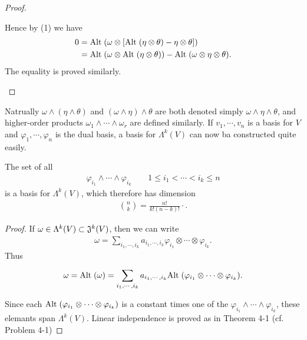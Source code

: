 \begin{proof}
\begin{enumerate}[label=(\arabic*)]
            Hence by (1) we have 
            \begin{align*}
                0 
                & = \mathrm{Alt}\;(\omega\otimes [\mathrm{Alt}\;(\eta\otimes\theta) - \eta\otimes\theta]) \\
                & = \mathrm{Alt}\;(\omega\otimes\mathrm{Alt}\;(\eta\otimes\theta)) - \mathrm{Alt}\;(\omega\otimes\eta\otimes\theta). 
            \end{align*}
            The equality is proved similarly.
    \end{enumerate}
\end{proof}

Natrually $\omega\wedge(\eta\wedge\theta)$ and $(\omega\wedge\eta)\wedge\theta$ are both denoted simply 
$\omega\wedge\eta\wedge\theta$, and higher-order products $\omega_1\wedge\cdots\wedge\omega_r$ are defined 
similarly. If $v_1, \cdots, v_n$ is a basis for $V$ and $\varphi_1,\cdots, \varphi_n$ is the dual basis,
a basis for $\Lambda^k(V)$ can now ba constructed quite easily. 

\begin{theorem}
    The set of all
    \begin{align*}
      \varphi_{i_1}\wedge\cdots\wedge\varphi_{i_k}\quad\quad 1\leq i_1<\cdots<i_k\le n
    \end{align*} 
    is a basis for $\Lambda^k(V)$, which therefore has dimension 
    \begin{align*}
      \binom nk=\frac{n!}{k!(n-k)!}\cdotp.
    \end{align*}
\end{theorem}

\begin{proof}
    If $\omega\in \Lambda^k(V)\subset \mathfrak{J}^k(V)$, then we can write 
    \begin{align*}
      \omega = \sum_{i_1, \cdots, i_k}^{}{a_{i_1,\cdots,i_k}\varphi_{i_1}\otimes\cdots\otimes\varphi_{i_k}}.
    \end{align*}
    Thus 
    \begin{align*}
        \omega
        = \mathrm{Alt}\;(\omega) 
        = \sum_{i_1, \cdots, i_k}^{}{a_{i_1,\cdots,i_k}\mathrm{Alt}\;(\varphi_{i_1}\otimes\cdots\otimes\varphi_{i_k})}.
    \end{align*}

    Since each $\mathrm{Alt}\;(\varphi_{i_1}\otimes\cdots\otimes\varphi_{i_k})$ is a constant times one of the 
    $\varphi_{i_1}\wedge\cdots\wedge\varphi_{i_k}$, these elemants span $\Lambda^k(V)$. Linear independence 
    is proved as in Theorem 4-1 (cf. Problem 4-1)
\end{proof}

